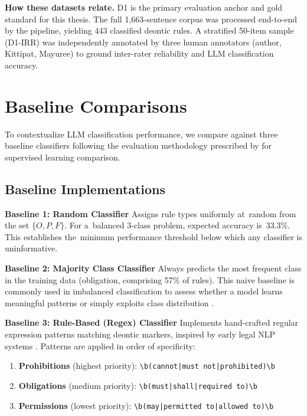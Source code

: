 \textbf{How these datasets relate.} D1 is the primary evaluation anchor and gold standard for this thesis. The full 1,663-sentence corpus was processed end-to-end by the pipeline, yielding 443 classified deontic rules. A stratified 50-item sample (D1-IRR) was independently annotated by three human annotators (author, Kittipat, Mayuree) to ground inter-rater reliability and LLM classification accuracy.

\section{Baseline Comparisons}
\label{sec:baselines}

To contextualize LLM classification performance, we compare against three baseline classifiers following the evaluation methodology prescribed by \citet{dietterich1998approximate} for supervised learning comparison.

\subsection{Baseline Implementations}

\textbf{Baseline 1: Random Classifier}  
Assigns rule types uniformly at~random from the set $\{O, P, F\}$. For a~balanced 3-class problem, expected accuracy is~33.3\%. This establishes the~minimum performance threshold below which any classifier is uninformative.

\textbf{Baseline 2: Majority Class Classifier}  
Always predicts the most frequent class in the training data (obligation, comprising 57\% of rules). This naive baseline is commonly used in imbalanced classification to assess whether a model learns meaningful patterns or simply exploits class distribution \citep{kubat1997addressing}.

\textbf{Baseline 3: Rule-Based (Regex) Classifier}  
Implements hand-crafted regular expression patterns matching deontic markers, inspired by early legal NLP systems \citep{breaux2008analyzing, maxwell2011software}. Patterns are applied in order of specificity:

\begin{enumerate}
    \item \textbf{Prohibitions} (highest priority): \texttt{\textbackslash b(cannot|must not|prohibited)\textbackslash b}
    \item \textbf{Obligations} (medium priority): \texttt{\textbackslash b(must|shall|required to)\textbackslash b}
    \item \textbf{Permissions} (lowest priority): \texttt{\textbackslash b(may|permitted to|allowed to)\textbackslash b}
\end{enumerate}

